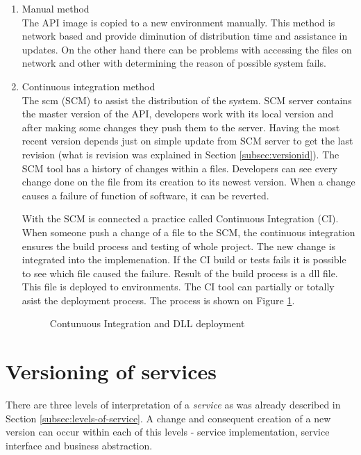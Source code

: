 \begin{enumerate}
  \item{Manual method} \hfill \\
  The API image is copied to a new environment manually. This method is network based and provide diminution of distribution time and assistance in updates. On the other hand there can be problems with accessing the files on network and other with determining the reason of possible system fails. 
  \item{Continuous integration method} \hfill \\
  The \gls{scm} (SCM) to assist the distribution of the system. SCM server contains the master version of the API, developers work with its local version and after making some changes they push them to the server. Having the most recent version depends just on simple update from SCM server to get the last revision (what is revision was explained in Section \ref{subsec:versionid}). The SCM tool has a history of changes within a files. Developers can see every change done on the file from its creation to its newest version. When a change causes a failure of function of software, it can be reverted.
  
  With the SCM is connected a practice called Continuous Integration (CI). When someone push a change of a file to the SCM, the continuous integration ensures the build process and testing of whole project. The new change is integrated into the implemenation. If the CI build or tests fails it is possible to see which file caused the failure. 
  Result of the build process is a \gls{dll} file. This file is deployed to environments. The CI tool can partially or totally asist the deployment process. The process is shown on Figure \ref{fig:deployment-process}.
  
\begin{figure}[htp] 
\caption{Contunuous Integration and DLL deployment}
\label{fig:deployment-process}
\end{figure} 
   
\end{enumerate}


\section{Versioning of services}
\label{sec:verioningservices}
There are three levels of interpretation of a \emph{service} as was already described in Section \ref{subsec:levels-of-service}. A change and consequent creation of a new version can occur within each of this levels - service implementation, service interface and business abstraction.

